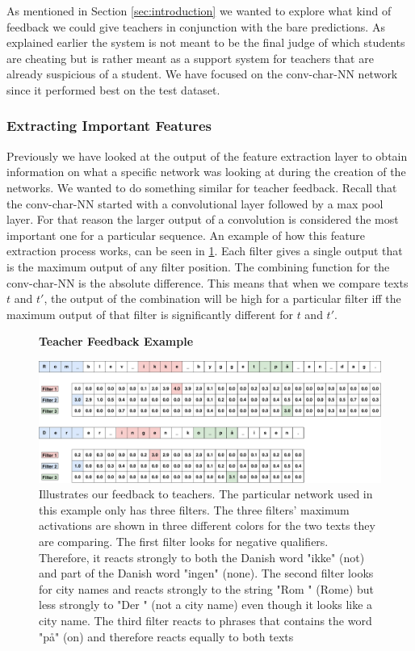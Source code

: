 As mentioned in Section \ref{sec:introduction} we wanted to explore what kind
of feedback we could give teachers in conjunction with the bare predictions.
As explained earlier the system is not meant to be the final judge of which
students are cheating but is rather meant as a support system for teachers that
are already suspicious of a student. We have focused on the \gls{conv-char-NN}
network since it performed best on the test dataset.


\subsubsection{Extracting Important Features}

Previously we have looked at the output of the feature extraction layer to
obtain information on what a specific network was looking at during the
creation of the networks. We wanted to do something similar for teacher
feedback. Recall that the \gls{conv-char-NN} started with a convolutional
layer followed by a max pool layer. For that reason the larger output of a
convolution is considered the most important one for a particular sequence.
An example of how this feature extraction process works, can be seen in
\ref{fig:feature_extraction_output_example}. Each filter gives a single output
that is the maximum output of any filter position. The combining function for
the \gls{conv-char-NN} is the absolute difference. This means that when we
compare texts $t$ and $t'$, the output of the combination will be high for
a particular filter iff the maximum output of that filter is significantly
different for $t$ and $t'$.

\begin{figure}
    \centering
    \textbf{Teacher Feedback Example}\par\medskip
    \includegraphics[width=\textwidth]{./pictures/discussion/teacher_feedback_example}
    \caption{Illustrates our feedback to teachers. The particular network
    used in this example only has three filters. The three filters' maximum
    activations are shown in three different colors for the two texts they are
    comparing. The first filter looks for negative qualifiers. Therefore, it
    reacts strongly to both the Danish word "ikke" (not) and part of the Danish
    word "ingen" (none). The second filter looks for city names and reacts
    strongly to the string "Rom " (Rome) but less strongly to "Der " (not a city
    name) even though it looks like a city name. The third filter reacts to
    phrases that contains the word "p\aa " (on) and therefore reacts equally to
    both texts}
    \label{fig:feature_extraction_output_example}
\end{figure}

